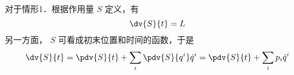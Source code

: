 对于情形1．根据作用量 $S$ 定义，有
\begin{equation}
\dv{S}{t}=L
\end{equation}
另一方面， $S$ 可看成初末位置和时间的函数，于是
\begin{equation}
\dv{S}{t}=\pdv{S}{t}+\sum_i\pdv{S}{q^i}\dot q^i=\pdv{S}{t}+\sum_ip_i\dot q^i
\end{equation}

